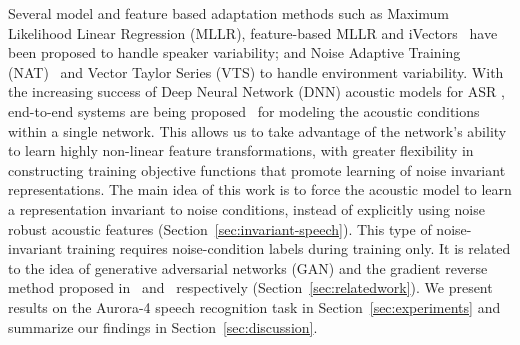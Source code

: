 \documentclass{article}
\begin{document}
    Several model and feature based adaptation methods such as Maximum Likelihood Linear Regression (MLLR),  feature-based MLLR 
    and iVectors~\cite{ivec} have been proposed to handle speaker variability; and Noise Adaptive Training (NAT)~\cite{msftnoise}  
    and Vector Taylor Series (VTS) to handle environment variability. With the increasing success of Deep Neural Network (DNN) 
    acoustic models for ASR \cite{hinton2012deep, msft, ibm}, end-to-end systems are being proposed~\cite{essen, scatterTransforms, fromaudio} 
    for modeling the acoustic conditions within a single network. This allows us to take advantage of the network's ability to learn 
    highly non-linear feature transformations, with greater flexibility in constructing training objective functions that promote learning 
    of noise invariant representations. The main idea of this work is to force the acoustic model to learn a representation invariant to 
    noise conditions, instead of explicitly using noise robust acoustic features (Section~\ref{sec:invariant-speech}). This type of 
    noise-invariant training requires noise-condition labels during training only. It is related to the idea of generative adversarial 
    networks (GAN) and the gradient reverse method proposed in~\cite{goodfellow2014generative} and~\cite{ganin2014unsupervised} respectively 
    (Section~\ref{sec:relatedwork}). We present results on the Aurora-4 speech recognition task in Section~\ref{sec:experiments} and summarize 
    our findings in Section~\ref{sec:discussion}.
    
\end{document}
